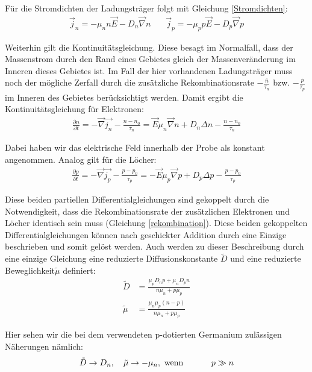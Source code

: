 \documentclass[12pt]{article}
\begin{document}
Für die Stromdichten der Ladungsträger folgt mit Gleichung \ref{Stromdichten}:
\begin{align}
 \vec{j}_n=- \mu_n n \vec{E} -  D_n \vec{\nabla} n ~~~~~~~~ \vec{j}_p=- \mu_p p \vec{E} -  D_p \vec{\nabla} p
\end{align}

Weiterhin gilt die Kontinuitätsgleichung. Diese besagt im Normalfall, dass der Massenstrom durch den Rand eines Gebietes gleich der Massenveränderung im Inneren dieses Gebietes ist. Im Fall der hier vorhandenen Ladungsträger muss noch der mögliche Zerfall durch die zusätzliche Rekombinationsrate $-\frac{\overline{n}}{\tau_n}$ bzw. $-\frac{\overline{p}}{\tau_p}$ im Inneren des Gebietes berücksichtigt werden. Damit ergibt die Kontinuitätsgleichung für Elektronen:
\begin{align}
 \frac{\partial n}{\partial t} = - \vec{\nabla} \vec{j_n}- \frac{n-n_0}{\tau_n}=\vec{E}\mu_n \vec{\nabla} n +D_n \Delta n - \frac{n-n_0}{\tau_n}
\end{align}

Dabei haben wir das elektrische Feld innerhalb der Probe als konstant angenommen. Analog gilt für die Löcher:
\begin{align}
 \frac{\partial p}{\partial t} = - \vec{\nabla} \vec{j_p}- \frac{p-p_0}{\tau_p}=-\vec{E}\mu_p \vec{\nabla} p +D_p \Delta p - \frac{p-p_0}{\tau_p}
\end{align}

Diese beiden partiellen Differentialgleichungen sind gekoppelt durch die Notwendigkeit, dass die Rekombinationsrate der zusätzlichen Elektronen und Löcher identisch sein muss (Gleichung \ref{rekombination}). Diese beiden gekoppelten Differentialgleichungen können nach geschickter Addition durch eine Einzige beschrieben und somit gelöst werden. Auch werden zu dieser Beschreibung durch eine einzige Gleichung eine reduzierte Diffusionskonstante $\tilde{D}$ und eine reduzierte Beweglichkeit$\tilde{\mu}$ definiert:
\begin{align}
\tilde{D}&= \frac{\mu_p D_n p + \mu_n D_p n}{n \mu_n + p\mu_p} \\
\tilde{\mu} &= \frac{\mu_n \mu_p (n-p)}{n\mu_n + p\mu_p}
\end{align}

Hier sehen wir die bei dem verwendeten p-dotierten Germanium zulässigen Näherungen nämlich:
\begin{align}
\tilde{D}\rightarrow D_n,~~~ \tilde{\mu}\rightarrow -\mu_n,~\textnormal{wenn} ~~~~~~~~~~p\gg n
\end{align}
\end{document}
